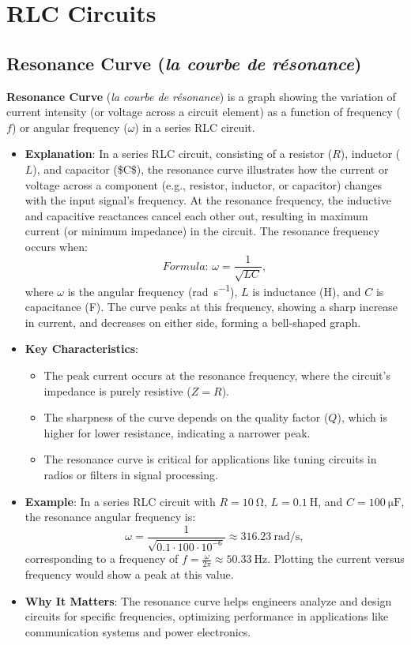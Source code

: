 \documentclass[12pt]{article}
\newcommand{\concept}[1]{\textbf{#1}}
\newcommand{\formula}[1]{\textit{Formula: }#1}
\begin{document}
\section{RLC Circuits}
\subsection{Resonance Curve (\textit{la courbe de résonance})}
\concept{Resonance Curve} (\textit{la courbe de résonance}) is a graph showing the variation of current intensity (or voltage across a circuit element) as a function of frequency (\(f\)) or angular frequency (\(\omega\)) in a series RLC circuit.
\begin{itemize}
    \item \textbf{Explanation}: In a series RLC circuit, consisting of a resistor (\(R\)), inductor (\(L\)), and capacitor (\$C\$), the resonance curve illustrates how the current or voltage across a component (e.g., resistor, inductor, or capacitor) changes with the input signal’s frequency. At the resonance frequency, the inductive and capacitive reactances cancel each other out, resulting in maximum current (or minimum impedance) in the circuit. The resonance frequency occurs when:
        \[
        \formula{\omega = \frac{1}{\sqrt{L C}}},
        \]
        where \(\omega\) is the angular frequency (\si{\radian\per\second}), \(L\) is inductance (\si{\henry}), and \(C\) is capacitance (\si{\farad}). The curve peaks at this frequency, showing a sharp increase in current, and decreases on either side, forming a bell-shaped graph.
    \item \textbf{Key Characteristics}:
        \begin{itemize}
            \item The peak current occurs at the resonance frequency, where the circuit’s impedance is purely resistive (\(Z = R\)).
            \item The sharpness of the curve depends on the quality factor (\(Q\)), which is higher for lower resistance, indicating a narrower peak.
            \item The resonance curve is critical for applications like tuning circuits in radios or filters in signal processing.
        \end{itemize}
    \item \textbf{Example}: In a series RLC circuit with \(R = \SI{10}{\ohm}\), \(L = \SI{0.1}{\henry}\), and \(C = \SI{100}{\micro\farad}\), the resonance angular frequency is:
        \[
        \omega = \frac{1}{\sqrt{0.1 \cdot 100 \cdot 10^{-6}}} \approx \SI{316.23}{\radian\per\second},
        \]
        corresponding to a frequency of \(f = \frac{\omega}{2 \pi} \approx \SI{50.33}{\hertz}\). Plotting the current versus frequency would show a peak at this value.
    \item \textbf{Why It Matters}: The resonance curve helps engineers analyze and design circuits for specific frequencies, optimizing performance in applications like communication systems and power electronics.
\end{itemize}
\end{document}
